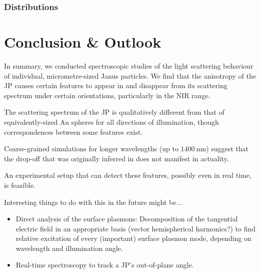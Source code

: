\documentclass[10pt]{article}
\begin{document}
\begin{multicols}{2}

\subsubsection*{Distributions} 











\section*{Conclusion \& Outlook}

In summary, we conducted spectroscopic studies of the light scattering behaviour of individual, micrometre-sized Janus particles. 
We find that the anisotropy of the JP causes certain features to appear in and disappear from its scattering spectrum under certain orientations, particularly in the NIR range. 

The scattering spectrum of the JP is qualitatively different from that of equivalently-sized Au spheres for all directions of illumination, though correspondences between some features exist.   

Coarse-grained simulations for longer wavelengths (up to $\SI{1400}{\nano\meter}$) suggest that the drop-off that was originally inferred in \cite*{MA} does not manifest in actuality. 

An experimental setup that can detect these features, possibly even in real time, is feasible.

Interesting things to do with this in the future might be...
\begin{itemize}
    \item Direct analysis of the surface plasmons: 
    Decomposition of the tangential electric field in an appropriate basis (vector hemispherical harmonics?) to find relative excitation of every (important) surface plasmon mode, depending on wavelength and illumination angle.
    \item Real-time spectroscopy to track a JP's out-of-plane angle. 
\end{itemize}


\end{multicols}
\end{document}
